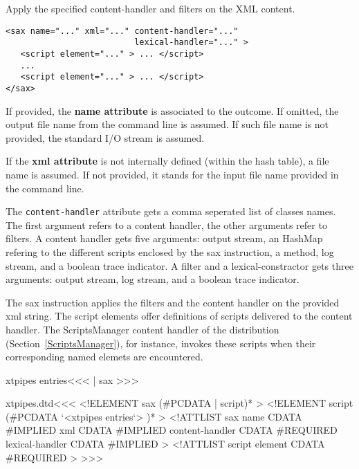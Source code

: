 \documentclass{article}
\begin{document}
{Apply the specified content-handler and filters on the XML
content.

\begin{verbatim}
<sax name="..." xml="..." content-handler="..."
                          lexical-handler="..." >
   <script element="..." > ... </script>
   ...
   <script element="..." > ... </script>
</sax>
\end{verbatim}


If provided, the {\bf name attribute} is associated to the outcome.
If omitted, the output file name from the command line is assumed. If
such file name is not provided, the standard I/O stream is assumed.

If the {\bf xml attribute} is not internally defined (within the hash
table), a file name is assumed.  If not provided, it stands for the
input file name provided in the command line.

The \verb+content-handler+ attribute gets a comma seperated list of
classes names. The first argument refers to a content handler, the
other arguments refer to filters. A content handler gets five
arguments: output stream, an HashMap refering to the different scripts
enclosed by the sax instruction, a method, log stream, and a boolean
trace indicator.  A filter and a lexical-constractor gets three
arguments: output stream, log stream, and a boolean trace indicator.

The sax instruction applies the filters and the content handler on the
provided xml string.  The script elements offer definitions of scripts
delivered to the content handler. The ScriptsManager content handler
of the distribution (Section~\ref{ScriptsManager}), for instance,
invokes these scripts when their corresponding named elemets are
encountered.


\<xtpipes entries\><<<
| sax
>>>


\<xtpipes.dtd\><<<
<!ELEMENT sax (#PCDATA | script)*  >
<!ELEMENT script (#PCDATA `<xtpipes entries`> )*  >
<!ATTLIST sax
          name            CDATA #IMPLIED
          xml             CDATA #IMPLIED
          content-handler CDATA #REQUIRED
          lexical-handler CDATA #IMPLIED
>
<!ATTLIST script
          element CDATA #REQUIRED
>
>>>

}
\end{document}
